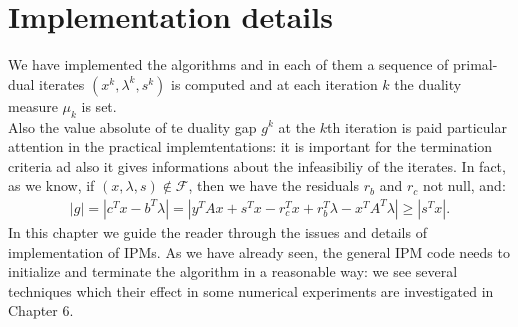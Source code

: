 \documentclass[a4paper,10 pt,titlepage,twoside]{book}
\theoremstyle{plain}
\theoremstyle{definition}
\theoremstyle{remark}
\begin{document}

\chapter{Implementation details}
We have implemented the algorithms and in each of them a sequence of primal-dual iterates $(x^{k},\lambda^{k},s^{k})$ is computed and at each iteration $k$ the duality measure $\mu_{k}$ is set.\\
Also the value absolute of te duality gap $g^{k}$ at the $k$th iteration is paid particular attention in the practical implemtentations: it is important for the termination criteria ad also it gives informations about the infeasibiliy of the iterates. In fact, as we know, if $(x,\lambda,s) \notin \mathcal{F}$, then we have the residuals $r_{b}$ and $r_{c}$ not null, and: 
\begin{align*}
|g|=|c^{T}x-b^{T}\lambda|=|y^{T}Ax+s^{T}x-r_{c}^{T}x+r_{b}^{T}\lambda-x^{T}A^{T}\lambda|\geq |s^{T}x|.
\end{align*}
In this chapter we guide the reader through the issues and details of implementation of IPMs. As we have already seen, the general IPM code needs to initialize and terminate the algorithm in a reasonable way: we see several techniques which their effect in some numerical experiments are investigated in Chapter 6.  
\end{document}
